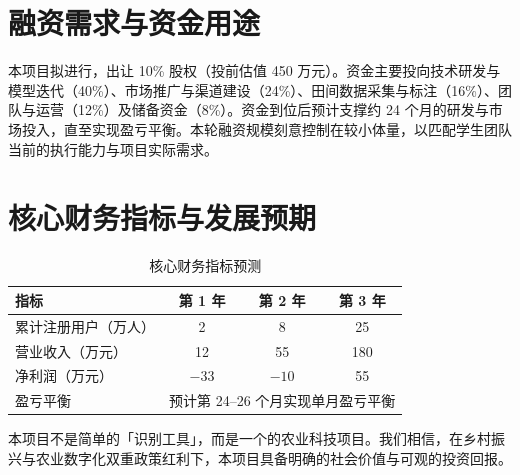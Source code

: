 \section{融资需求与资金用途}

本项目拟进行，出让 10\% 股权（投前估值 450 万元）。资金主要投向技术研发与模型迭代（40\%）、市场推广与渠道建设（24\%）、田间数据采集与标注（16\%）、团队与运营（12\%）及储备资金（8\%）。资金到位后预计支撑约 24 个月的研发与市场投入，直至实现盈亏平衡。本轮融资规模刻意控制在较小体量，以匹配学生团队当前的执行能力与项目实际需求。

\section{核心财务指标与发展预期}

\begin{table}[H]
  \centering
  \small
  \renewcommand{\arraystretch}{1.25}
  \caption{核心财务指标预测}
  \begin{tabular}{lccc}
    \toprule
    指标 & 第 1 年 & 第 2 年 & 第 3 年 \\
    \midrule
    累计注册用户（万人） & 2 & 8 & 25 \\
    营业收入（万元） & 12 & 55 & 180 \\
    净利润（万元） & $-33$ & $-10$ & 55 \\
    盈亏平衡 & \multicolumn{3}{c}{预计第 24--26 个月实现单月盈亏平衡} \\
    \bottomrule
  \end{tabular}
\end{table}

本项目不是简单的「识别工具」，而是一个的农业科技项目。我们相信，在乡村振兴与农业数字化双重政策红利下，本项目具备明确的社会价值与可观的投资回报。
